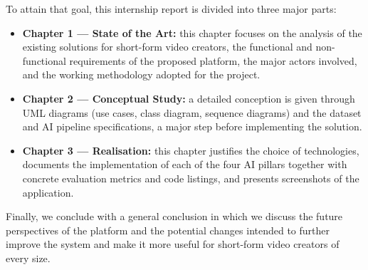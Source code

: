 \bigskip

To attain that goal, this internship report is divided into three major parts:

\begin{itemize}
  \item \textbf{Chapter 1 --- State of the Art:} this chapter focuses on the analysis of the
        existing solutions for short-form video creators, the functional and non-functional
        requirements of the proposed platform, the major actors involved, and the working
        methodology adopted for the project.
  \item \textbf{Chapter 2 --- Conceptual Study:} a detailed conception is given through UML
        diagrams (use cases, class diagram, sequence diagrams) and the dataset and AI pipeline
        specifications, a major step before implementing the solution.
  \item \textbf{Chapter 3 --- Realisation:} this chapter justifies the choice of technologies,
        documents the implementation of each of the four AI pillars together with concrete
        evaluation metrics and code listings, and presents screenshots of the application.
\end{itemize}

Finally, we conclude with a general conclusion in which we discuss the future perspectives of
the platform and the potential changes intended to further improve the system and make it more
useful for short-form video creators of every size.

\cleardoublepage
